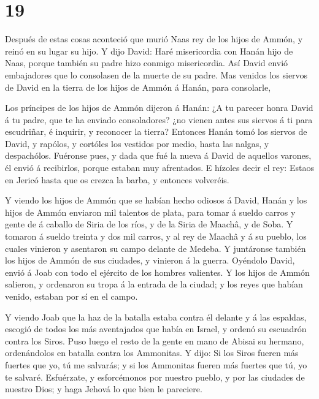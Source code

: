 \hypertarget{section-18}{%
\section{19}\label{section-18}}

 Después de estas cosas aconteció que murió Naas rey de los
hijos de Ammón, y reinó en su lugar su hijo.  Y dijo David:
Haré misericordia con Hanán hijo de Naas, porque también su padre hizo
conmigo misericordia. Así David envió embajadores que lo consolasen de
la muerte de su padre. Mas venidos los siervos de David en la tierra de
los hijos de Ammón á Hanán, para consolarle,

 Los príncipes de los hijos de Ammón dijeron á Hanán: ¿A tu
parecer honra David á tu padre, que te ha enviado consoladores? ¿no
vienen antes sus siervos á ti para escudriñar, é inquirir, y reconocer
la tierra?  Entonces Hanán tomó los siervos de David, y
rapólos, y cortóles los vestidos por medio, hasta las nalgas, y
despachólos.  Fuéronse pues, y dada que fué la nueva á David
de aquellos varones, él envió á recibirlos, porque estaban muy
afrentados. E hízoles decir el rey: Estaos en Jericó hasta que os crezca
la barba, y entonces volveréis.

 Y viendo los hijos de Ammón que se habían hecho odiosos á
David, Hanán y los hijos de Ammón enviaron mil talentos de plata, para
tomar á sueldo carros y gente de á caballo de Siria de los ríos, y de la
Siria de Maachâ, y de Soba.  Y tomaron á sueldo treinta y
dos mil carros, y al rey de Maachâ y á su pueblo, los cuales vinieron y
asentaron su campo delante de Medeba. Y juntáronse también los hijos de
Ammón de sus ciudades, y vinieron á la guerra.  Oyéndolo
David, envió á Joab con todo el ejército de los hombres valientes.
 Y los hijos de Ammón salieron, y ordenaron su tropa á la
entrada de la ciudad; y los reyes que habían venido, estaban por sí en
el campo.

 Y viendo Joab que la haz de la batalla estaba contra él
delante y á las espaldas, escogió de todos los más aventajados que había
en Israel, y ordenó su escuadrón contra los Siros.  Puso
luego el resto de la gente en mano de Abisai su hermano, ordenándolos en
batalla contra los Ammonitas.  Y dijo: Si los Siros fueren
más fuertes que yo, tú me salvarás; y si los Ammonitas fueren más
fuertes que tú, yo te salvaré.  Esfuérzate, y esforcémonos
por nuestro pueblo, y por las ciudades de nuestro Dios; y haga Jehová lo
que bien le pareciere.

